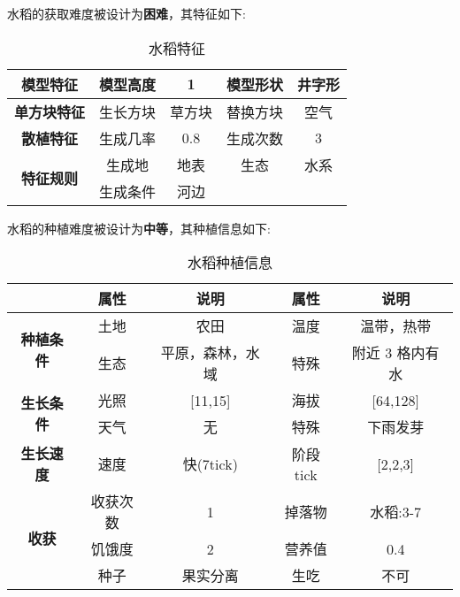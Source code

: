水稻的获取难度被设计为\textbf{困难}，其特征如下:
\begin{table}[H]
    \centering
    \caption{水稻特征}
    \label{table:水稻特征}
    \setlength{\tabcolsep}{4mm}
    \begin{tabular}{c|cc|cc}
        \toprule
        \textbf{模型特征}                  & 模型高度 & 1      & 模型形状 & 井字形 \\
        \midrule
        \textbf{单方块特征}                & 生长方块 & 草方块 & 替换方块 & 空气   \\
        \midrule
        \textbf{散植特征}                  & 生成几率 & 0.8    & 生成次数 & 3      \\
        \midrule
        \multirow{2}{*}{\textbf{特征规则}} & 生成地   & 地表   & 生态     & 水系   \\
                                           & 生成条件 & 河边                       \\
        \bottomrule
    \end{tabular}
\end{table}


水稻的种植难度被设计为\textbf{中等}，其种植信息如下:

\begin{table}[H]
    \centering
    \caption{水稻种植信息}
    \label{table:水稻种植信息}
    \setlength{\tabcolsep}{4mm}
    \begin{tabular}{c|cc|cc}
        \toprule
                                           & \textbf{属性} & \textbf{说明}    & \textbf{属性} & \textbf{说明}   \\
        \midrule
        \multirow{2}{*}{\textbf{种植条件}} & 土地          & 农田             & 温度          & 温带，热带      \\
                                           & 生态          & 平原，森林，水域 & 特殊          & 附近 3 格内有水 \\
        \midrule
        \multirow{2}{*}{\textbf{生长条件}} & 光照          & [11,15]          & 海拔          & [64,128]        \\
                                           & 天气          & 无               & 特殊          & 下雨发芽               \\
        \midrule
        \textbf{生长速度}                  & 速度          & 快(7tick)        & 阶段tick      & [2,2,3]         \\
        \midrule
        \multirow{3}{*}{\textbf{收获}}     & 收获次数      & 1                & 掉落物        & 水稻:3-7        \\
                                           & 饥饿度        & 2                & 营养值        & 0.4             \\
                                           & 种子 & 果实分离 & 生吃 & 不可 \\
        \bottomrule
    \end{tabular}
\end{table}

